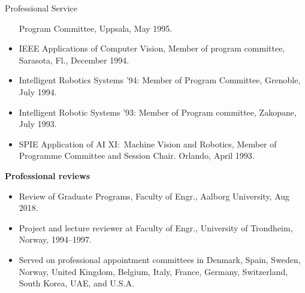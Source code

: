 \documentclass{article}
\begin{document}
\begin{cv}
\begin{cvlist}{Professional Service}
\begin{itemize}
    Program Committee, Uppsala, May 1995.
  \item IEEE Applications of Computer Vision, Member of program
    committee, Sarasota, Fl., December 1994.
  \item Intelligent Robotics Systems '94: Member of Program Committee,
    Grenoble, July 1994.
  \item Intelligent Robotic Systems '93: Member of Program committee,
    Zakopane, July 1993.
  \item SPIE Application of AI XI:\ Machine Vision and Robotics, Member
    of Programme Committee and Session Chair. Orlando, April 1993.
\end{itemize}

\item {\bf Professional reviews}
  \begin{itemize}
  \item Review of Graduate Programs, Faculty of Engr., Aalborg University, Aug 2018.
  \item Project and lecture reviewer at Faculty of Engr., University of Trondheim, Norway, 1994--1997.
  \item Served on professional appointment committees in Denmark,
    Spain, Sweden, Norway, United Kingdom, Belgium, Italy, France,
    Germany, Switzerland, South Korea, UAE, and U.S.A.
  \end{itemize}


\end{cvlist}
\end{cv}
\end{document}
